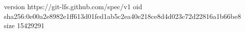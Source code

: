 version https://git-lfs.github.com/spec/v1
oid sha256:0e00a2e8982e1ff613d01fed1ab5c2ea40e218ce8d4d023c72d22816a1b66be8
size 15429291
